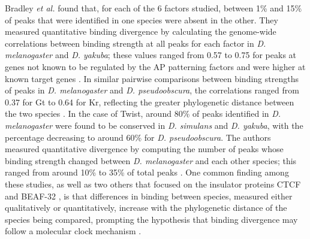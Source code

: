 Bradley \emph{et al.} found that, for each of the 6 factors studied, between 1\% and 15\% of peaks that were identified in one species were absent in the other. They measured quantitative binding divergence by calculating the genome-wide correlations between binding strength at all peaks for each factor in \emph{D. melanogaster} and \emph{D. yakuba}; these values ranged from 0.57 to 0.75 for peaks at genes not known to be regulated by the AP patterning factors and were higher at known target genes \citep{bradley_binding_2010}. In similar pairwise comparisons between binding strengths of peaks in \emph{D. melanogaster} and \emph{D. pseudoobscura}, the correlations ranged from 0.37 for Gt to 0.64 for Kr, reflecting the greater phylogenetic distance between the two species \citep{paris_extensive_2013}. In the case of Twist, around 80\% of peaks identified in \emph{D. melanogaster} were found to be conserved in \emph{D. simulans} and \emph{D. yakuba}, with the percentage decreasing to around 60\% for \emph{D. pseudoobscura}. The authors measured quantitative divergence by computing the number of peaks whose binding strength changed between \emph{D. melanogaster} and each other species; this ranged from around 10\% to 35\% of total peaks \citep{he_high_2011}. One common finding among these studies, as well as two others that focused on the insulator proteins CTCF and BEAF-32 \citep{ni_adaptive_2012,yang_beaf-32_2012}, is that differences in binding between species, measured either qualitatively or quantitatively, increase with the phylogenetic distance of the species being compared, prompting the hypothesis that binding divergence may follow a molecular clock mechanism \citep{he_high_2011}.

